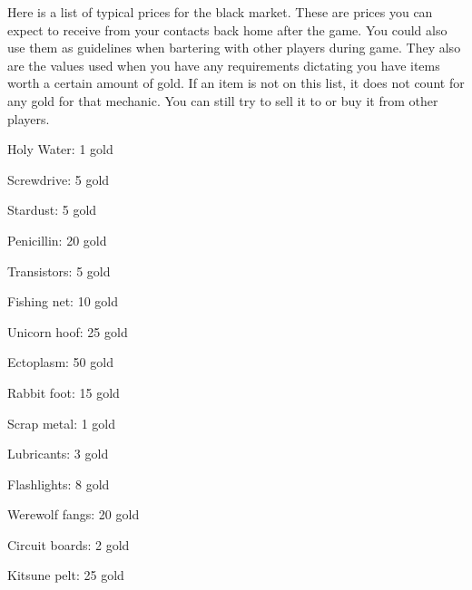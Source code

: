 \documentclass[green]{guildcamp3}
\begin{document}
	
	\name{\gBlackMarket{}}
	
	Here is a list of typical prices for the black market. These are prices you can expect to receive from your contacts back home after the game. You could also use them as guidelines when bartering with other players during game. They also are the values used when you have any requirements dictating you have items worth a certain amount of gold. If an item is not on this list, it does not count for any gold for that mechanic. You can still try to sell it to or buy it from other players. 
	
	Holy Water: 1 gold
	
	Screwdrive: 5 gold
	
	Stardust: 5 gold
	
	Penicillin: 20 gold
	
	Transistors: 5 gold
	
	Fishing net: 10 gold
	
	Unicorn hoof: 25 gold
	
	Ectoplasm: 50 gold
	
	Rabbit foot: 15 gold
	
	Scrap metal: 1 gold
	
	Lubricants: 3 gold
	
	Flashlights: 8 gold
	
	Werewolf fangs: 20 gold
	
	Circuit boards: 2 gold
	
	Kitsune pelt: 25 gold
	
\end{document}
